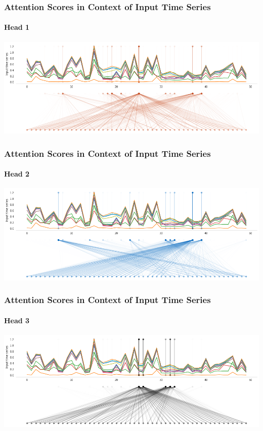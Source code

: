 \begin{frame}
	\frametitle{Attention Scores in Context of Input Time Series}
	\framesubtitle{Head 1}
	\includegraphics[width=\textwidth]{images/self-attention/transformer/self-attention-1/head0_conn_input}
\end{frame}

\begin{frame}
\frametitle{Attention Scores in Context of Input Time Series}
\framesubtitle{Head 2}
\includegraphics[width=\textwidth]{images/self-attention/transformer/self-attention-1/head1_conn_input}
\end{frame}

\begin{frame}
\frametitle{Attention Scores in Context of Input Time Series}
\framesubtitle{Head 3}
\includegraphics[width=\textwidth]{images/self-attention/transformer/self-attention-1/head2_conn_input}
\end{frame}


